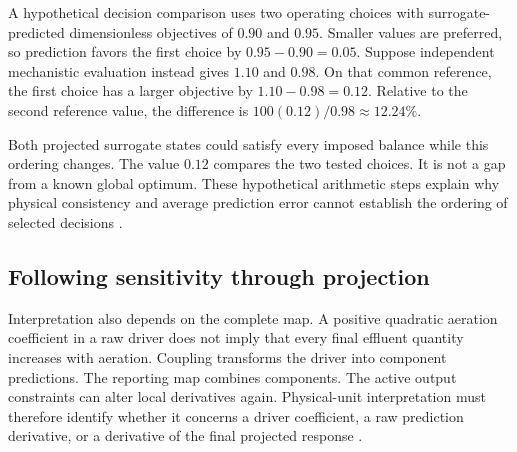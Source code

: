 A hypothetical decision comparison uses two operating choices with surrogate-predicted dimensionless objectives of $0.90$ and $0.95$. Smaller values are preferred, so prediction favors the first choice by $0.95-0.90=0.05$. Suppose independent mechanistic evaluation instead gives $1.10$ and $0.98$. On that common reference, the first choice has a larger objective by $1.10-0.98=0.12$. Relative to the second reference value, the difference is $100(0.12)/0.98\approx12.24\%$.

Both projected surrogate states could satisfy every imposed balance while this ordering changes. The value $0.12$ compares the two tested choices. It is not a gap from a known global optimum. These hypothetical arithmetic steps explain why physical consistency and average prediction error cannot establish the ordering of selected decisions \citep{Alexandrov1998,Pedrozo2025}.

\subsection{Following sensitivity through projection}

Interpretation also depends on the complete map. A positive quadratic aeration coefficient in a raw driver does not imply that every final effluent quantity increases with aeration. Coupling transforms the driver into component predictions. The reporting map combines components. The active output constraints can alter local derivatives again. Physical-unit interpretation must therefore identify whether it concerns a driver coefficient, a raw prediction derivative, or a derivative of the final projected response \citep{Brunton2016,Shen2023}.

